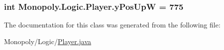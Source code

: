 \subsubsection[{\texorpdfstring{y\+Pos\+UpW}{yPosUpW}}]{\setlength{\rightskip}{0pt plus 5cm}int Monopoly.\+Logic.\+Player.\+y\+Pos\+UpW = 775\hspace{0.3cm}{\ttfamily [private]}}\hypertarget{class_monopoly_1_1_logic_1_1_player_a3de6131b99c15ef2a56b99252253db7f}{}\label{class_monopoly_1_1_logic_1_1_player_a3de6131b99c15ef2a56b99252253db7f}


The documentation for this class was generated from the following file\+:\begin{DoxyCompactItemize}
\item 
Monopoly/\+Logic/\hyperlink{_player_8java}{Player.\+java}\end{DoxyCompactItemize}
